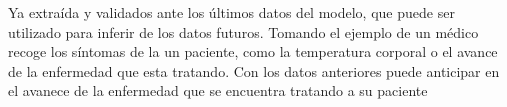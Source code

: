 
	Ya extraída y validados ante los últimos datos del modelo, que puede ser utilizado para inferir de los datos futuros. Tomando el ejemplo de un médico recoge los síntomas de la un paciente, como la temperatura corporal o el avance de la enfermedad que esta tratando. Con los datos anteriores puede anticipar en el avanece de la enfermedad que se encuentra tratando a su paciente

